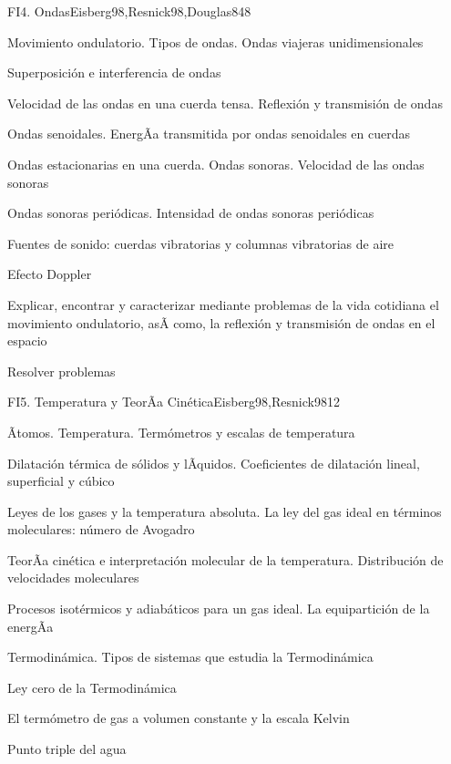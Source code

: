 \begin{syllabus}
\begin{unit}{FI4. Ondas}{Eisberg98,Resnick98,Douglas84}{8}
\begin{topics}
         \item  Movimiento ondulatorio. Tipos de ondas. Ondas viajeras unidimensionales
	 \item  Superposición e interferencia de ondas
         \item  Velocidad de las ondas en una cuerda tensa. Reflexión y transmisión de ondas
	 \item  Ondas senoidales. EnergÃ­a transmitida por ondas senoidales en cuerdas
         \item  Ondas estacionarias en una cuerda. Ondas sonoras. Velocidad de las ondas sonoras
	 \item  Ondas sonoras periódicas. Intensidad de ondas sonoras periódicas
	 \item  Fuentes de sonido: cuerdas vibratorias y columnas vibratorias de aire
	 \item  Efecto Doppler
   \end{topics}

   \begin{unitgoals}
         \item  Explicar, encontrar y caracterizar mediante problemas de la vida cotidiana el movimiento ondulatorio, asÃ­ como, la reflexión y transmisión de ondas en el espacio
         \item  Resolver problemas
   \end{unitgoals}
\end{unit}

\begin{unit}{FI5. Temperatura y TeorÃ­a Cinética}{Eisberg98,Resnick98}{12}
\begin{topics}
         \item  Ãtomos. Temperatura. Termómetros y escalas de temperatura
	 \item  Dilatación térmica de sólidos y lÃ­quidos. Coeficientes de dilatación lineal, superficial y cúbico
         \item  Leyes de los gases y la temperatura absoluta. La ley del gas ideal en términos moleculares: número de Avogadro
	 \item  TeorÃ­a cinética e interpretación molecular de la temperatura. Distribución de velocidades moleculares
         \item  Procesos isotérmicos y adiabáticos para un gas ideal. La equipartición de la energÃ­a
	 \item  Termodinámica. Tipos de sistemas que estudia la Termodinámica
         \item  Ley cero de la Termodinámica
	 \item  El termómetro de gas a volumen constante y la escala Kelvin
         \item  Punto triple del agua
   \end{topics}


\end{unit}
\end{syllabus}
